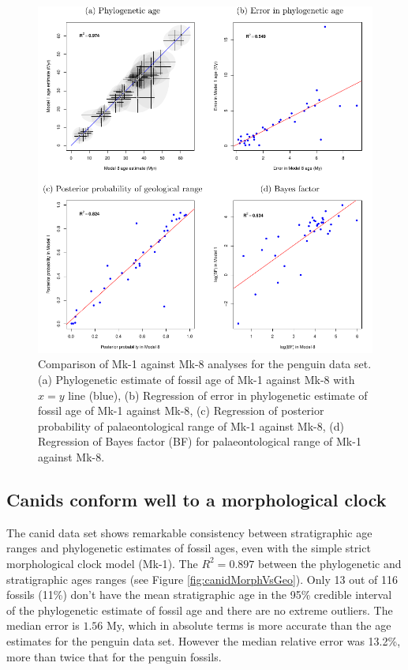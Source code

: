 \documentclass[11pt]{article}
\newcommand{\Mstrict}{{Mk-1}}
\newcommand{\Mrelaxed}{{Mk-8}}
\newcommand{\ncanidfossils}{{116}}
\begin{document}
\begin{figure}
\includegraphics{Figure_comparison.pdf}
\caption{\label{fig:compareM1M8}
Comparison of \Mstrict{} against \Mrelaxed{} analyses for the penguin data set. (a) Phylogenetic estimate of fossil age of \Mstrict{} against \Mrelaxed{} with $x=y$ line (blue), (b) Regression of error in phylogenetic estimate of fossil age of \Mstrict{} against \Mrelaxed{}, (c) Regression of posterior probability of palaeontological range of \Mstrict{} against \Mrelaxed{}, (d) Regression of Bayes factor (BF) for palaeontological range of \Mstrict{} against \Mrelaxed{}.}
\end{figure}





\subsection*{Canids conform well to a morphological clock}

The canid data set shows remarkable consistency between stratigraphic age ranges and phylogenetic estimates of fossil ages, even with the simple strict morphological clock model (\Mstrict{}).
The $R^2 = 0.897$ between the phylogenetic and stratigraphic ages ranges (see Figure \ref{fig:canidMorphVsGeo}). 
Only 13 out of \ncanidfossils{} fossils (11\%) don't have the mean stratigraphic age in the 95\% credible interval of the phylogenetic estimate of fossil age and there are no extreme outliers. 
The median error is $1.56$ My, which in absolute terms is more accurate than the age estimates for the penguin data set. However the median relative error was 13.2\%, more than twice that for the penguin fossils. 
\end{document}
